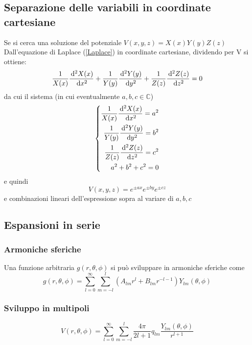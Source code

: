 \documentclass[../main.tex]{subfiles}
\begin{document}
\subsection{Separazione delle variabili in coordinate cartesiane}\label{Separazione}
Se si cerca una soluzione del potenziale $V(x, y, z)=X(x)Y(y)Z(z)$
Dall'equazione di Laplace (\cref{Laplace}) in coordinate cartesiane, dividendo per V si ottiene:
\begin{equation}
  \frac{1}{X(x)}\frac{\,\mathrm d^2X(x)}{\,\mathrm d x^2}+\frac{1}{Y(y)}\frac{\,\mathrm d^2Y(y)}{\,\mathrm d y^2}+\frac{1}{Z(z)}\frac{\,\mathrm d^2Z(z)}{\,\mathrm d z^2}=0
\end{equation}
da cui il sistema (in cui eventualmente $a, b, c \in \mathbb{C}$)
\begin{equation}
  \left\{
    \begin{aligned}
      \frac{1}{X(x)}\frac{\,\mathrm d^2X(x)}{\,\mathrm d x^2}=a^2\\
      \frac{1}{Y(y)}\frac{\,\mathrm d^2Y(y)}{\,\mathrm d y^2}=b^2\\
      \frac{1}{Z(z)}\frac{\,\mathrm d^2Z(z)}{\,\mathrm d z^2}=c^2\\
      a^2+b^2+c^2=0
    \end{aligned}
  \right.
\end{equation}
e quindi
\begin{equation}
  V(x, y, z)=e^{\pm ax}e^{\pm by}e^{\pm cz}
\end{equation}
e combinazioni lineari dell'espressione sopra al variare di $a, b, c$



\subsection{Espansioni in serie}
\subsubsection{Armoniche sferiche}
Una funzione arbitraria $g(r, \theta, \phi)$ si può sviluppare in armoniche sferiche come
\begin{equation}
  \label{Armoniche}
  g(r, \theta, \phi)= \sum_{l=0}^\infty \sum_{m=-l}^l (A_{lm}r^l+B_{lm}r^{-l-1}) Y_{lm}(\theta,\phi)
\end{equation}
\subsubsection{Sviluppo in multipoli}
\begin{equation}
  \label{Multipoli}
  V(r, \theta, \phi)=\sum_{l=0}^\infty \sum_{m=-l}^l \frac{4 \pi}{2l+1}q_{lm} \frac{Y_{lm}(\theta, \phi)}{r^{l+1}}
\end{equation}
\end{document}
